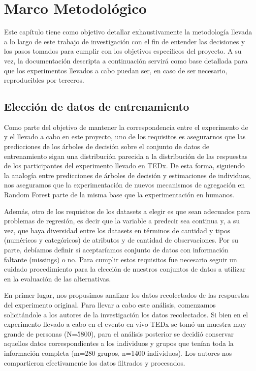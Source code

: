 %
\chapter{Marco Metodológico}
\label{ch::capitulo6}

Este capítulo tiene como objetivo detallar exhaustivamente la metodología llevada a lo largo de este trabajo de investigación con el fin de entender las decisiones y los pasos tomados para cumplir con los objetivos específicos del proyecto. A su vez, la documentación descripta a continuación servirá como base detallada para que los experimentos llevados a cabo puedan ser, en caso de ser necesario, reproducibles por terceros.

\section{Elección de datos de entrenamiento}

Como parte del objetivo de mantener la correspondencia entre el experimento de \cite{navajasAggregatedKnowledge} y el llevado a cabo en este proyecto, uno de los requisitos es asegurarnos que las predicciones de los árboles de decisión sobre el conjunto de datos de entrenamiento sigan una distribución parecida a la distribución de las respuestas de los participantes del experimento llevado en TEDx. De esta forma, siguiendo la analogía entre predicciones de árboles de decisión y estimaciones de individuos, nos aseguramos que la experimentación de nuevos mecanismos de agregación en Random Forest parte de la misma base que la experimentación en humanos.

Además, otro de los requisitos de los datasets a elegir es que sean adecuados para problemas de regresión, es decir que la variable a predecir sea continua y, a su vez, que haya diversidad entre los datasets en términos de cantidad y tipos (numéricos y categóricos) de atributos y de cantidad de observaciones. Por su parte, debíamos definir si aceptaríamos conjunto de datos con información faltante (missings) o no. Para cumplir estos requisitos fue necesario seguir un cuidado procedimiento para la elección de nuestros conjuntos de datos a utilizar en la evaluación de las alternativas.

En primer lugar, nos propusimos analizar los datos recolectados de las respuestas del experimento original. Para llevar a cabo este análisis, comenzamos solicitándole a los autores de la investigación los datos recolectados. Si bien en el experimento llevado a cabo en el evento en vivo TEDx se tomó un muestra muy grande de personas (N=5800), para el análisis posterior se decidió conservar aquellos datos correspondientes a los individuos y grupos que tenían toda la información completa (m=280 grupos, n=1400 individuos). Los autores nos compartieron efectivamente los datos filtrados y procesados.

